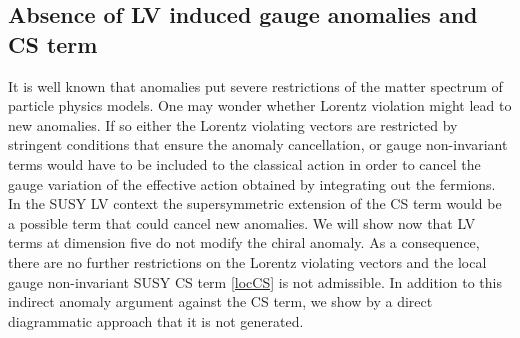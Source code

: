 \documentclass[12pt]{revtex4}
\begin{document}
\subsection{Absence of LV induced gauge anomalies and CS term}
\label{noAnomaly}


It is well known that anomalies put severe restrictions of the matter
spectrum of particle physics models. One may wonder whether Lorentz
violation might lead to new anomalies. If so either the Lorentz
violating vectors are restricted by stringent conditions that ensure the
anomaly cancellation, or gauge non-invariant terms would have to be
included to the classical action in order to cancel the gauge
variation of the effective action obtained by integrating out the
fermions. In the SUSY LV context the supersymmetric extension of the
CS term would be a possible term that could cancel new  
anomalies. We will show now that LV terms at dimension five
do not modify the chiral anomaly. As a consequence, there are no
further restrictions on the Lorentz violating vectors and the 
local gauge non-invariant SUSY CS term \eqref{locCS} is not
admissible. In addition to this indirect anomaly argument against the
CS term, we show by a direct diagrammatic approach that it is not
generated. 
\end{document}
